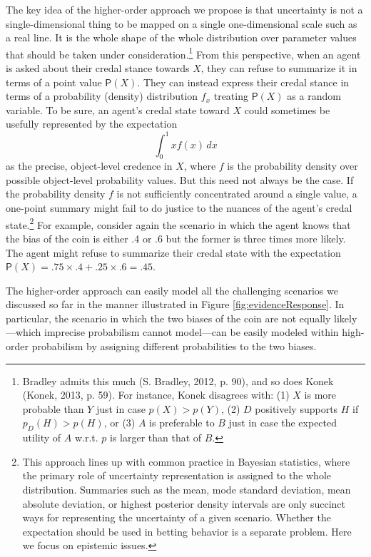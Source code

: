 \documentclass[
  10pt,
  dvipsnames,enabledeprecatedfontcommands]{scrartcl}
\begin{document}
The key idea of the higher-order approach we propose is that uncertainty
is not a single-dimensional thing to be mapped on a single
one-dimensional scale such as a real line. It is the whole shape of the
whole distribution over parameter values that should be taken under
consideration.\footnote{Bradley admits this much (S. Bradley, 2012, p.
  90), and so does Konek (Konek, 2013, p. 59). For instance, Konek
  disagrees with: (1) \(X\) is more probable than \(Y\) just in case
  \(p(X)>p(Y)\), (2) \(D\) positively supports \(H\) if
  \(p_D(H)> p(H)\), or (3) \(A\) is preferable to \(B\) just in case the
  expected utility of \(A\) w.r.t. \(p\) is larger than that of \(B\).}
From this perspective, when an agent is asked about their credal stance
towards \(X\), they can refuse to summarize it in terms of a point value
\(\mathsf{P}(X)\). They can instead express their credal stance in terms
of a probability (density) distribution \(f_x\) treating
\(\mathsf{P}(X)\) as a random variable. To be sure, an agent's credal
state toward \(X\) could sometimes be usefully represented by the
expectation\\
\[\int_{0}^{1} x f(x) \, dx\] as the precise, object-level credence in
\(X\), where \(f\) is the probability density over possible object-level
probability values. But this need not always be the case. If the
probability density \(f\) is not sufficiently concentrated around a
single value, a one-point summary might fail to do justice to the
nuances of the agent's credal state.\footnote{This approach lines up
  with common practice in Bayesian statistics, where the primary role of
  uncertainty representation is assigned to the whole distribution.
  Summaries such as the mean, mode standard deviation, mean absolute
  deviation, or highest posterior density intervals are only succinct
  ways for representing the uncertainty of a given scenario. Whether the
  expectation should be used in betting behavior is a separate problem.
  Here we focus on epistemic issues.} For example, consider again the
scenario in which the agent knows that the bias of the coin is either .4
or .6 but the former is three times more likely. The agent might refuse
to summarize their credal state with the expectation
\(\mathsf{P}(X) = .75 \times .4 + .25 \times .6 = .45\).

The higher-order approach can easily model all the challenging scenarios
we discussed so far in the manner illustrated in Figure
\ref{fig:evidenceResponse}. In particular, the scenario in which the two
biases of the coin are not equally likely---which imprecise probabilism
cannot model---can be easily modeled within high-order probabilism by
assigning different probabilities to the two biases.
\end{document}
